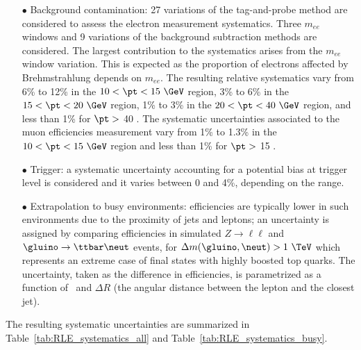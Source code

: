 \begin{itemize}
\item[$\bullet$] Background contamination: 27 variations of the tag-and-probe method are considered to assess the electron measurement systematics.
Three $m_{ee}$ windows and 9 variations of the background subtraction methods are considered.
The largest contribution to the systematics arises from the $m_{ee}$ window variation.
This is expected as the proportion of electrons affected by Brehmstrahlung depends on $m_{ee}$.
The resulting relative systematics vary from 6\% to 12\% in the $10<\pt<15~\GeV$ region, 3\% to 6\% in the $15<\pt<20~\GeV$ region, 1\% to 3\% in the $20<\pt<40~\GeV$ region, and less than 1\% for $\pt >$ 40 \GeV.
The systematic uncertainties associated to the muon efficiencies measurement vary from 1\% to 1.3\% in the $10<\pt<15~\GeV$ region and less than 1\% for $\pt >$ 15 \GeV. 
\item[$\bullet$] Trigger: a systematic uncertainty accounting for a potential bias at trigger level is considered and it varies between 0 and 4\%, depending on the \pt range.
\item[$\bullet$] Extrapolation to busy environments: efficiencies are typically lower in such environments due to the proximity of jets and leptons; 
an uncertainty is assigned by comparing efficiencies in simulated $Z\to\ell\ell$ and $\gluino\to\ttbar\neut$ events, for $\Delta m(\gluino,\neut)>1~\TeV$ which represents an extreme case of final states with highly boosted top quarks. 
The uncertainty, taken as the difference in efficiencies, is parametrized as a function of \pt\ and $\Delta R$ (the angular distance between the lepton and the closest jet). 
\end{itemize}
The resulting systematic uncertainties are summarized in Table~\ref{tab:RLE_systematics_all} and Table~\ref{tab:RLE_systematics_busy}.
